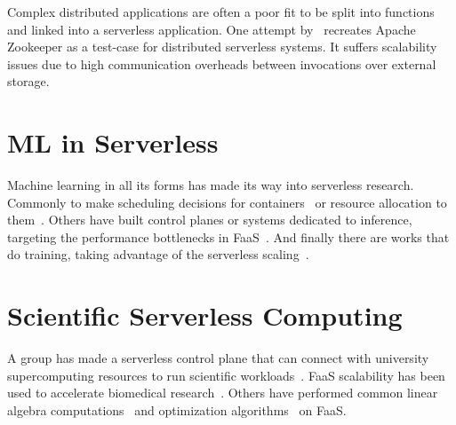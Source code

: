 Complex distributed applications are often a poor fit to be split into functions and linked into a serverless application.
One attempt by~\cite{copik2022faaskeeper} recreates Apache Zookeeper as a test-case for distributed serverless systems. 
It suffers scalability issues due to high communication overheads between invocations over external storage.

\section{ML in Serverless}
\label{sec:serverless-ai}

Machine learning in all its forms has made its way into serverless research.
Commonly to make scheduling decisions for containers~\cite{balaji2021fireplace} or resource allocation to them~\cite{mvondo2021ofc,eismann2021sizeless}.
Others have built control planes or systems dedicated to inference, targeting the performance bottlenecks in FaaS~\cite{yang2022infless, ali2022optimizing}.
And finally there are works that do training, taking advantage of the serverless scaling~\cite{wang2019distributed, gimeno2022mlless, xu2021lambdadnn}.


\section{Scientific Serverless Computing}

A group has made a serverless control plane that can connect with university supercomputing resources to run scientific workloads~\cite{funcx_hpdc_20}.
FaaS scalability has been used to accelerate biomedical research~\cite{kumanov2018serverless,hung2019rapid}.
Others have performed common linear algebra computations~\cite{werner2018serverless,shankar2020serverless} and optimization algorithms~\cite{aytekin2019harnessing} on FaaS.
